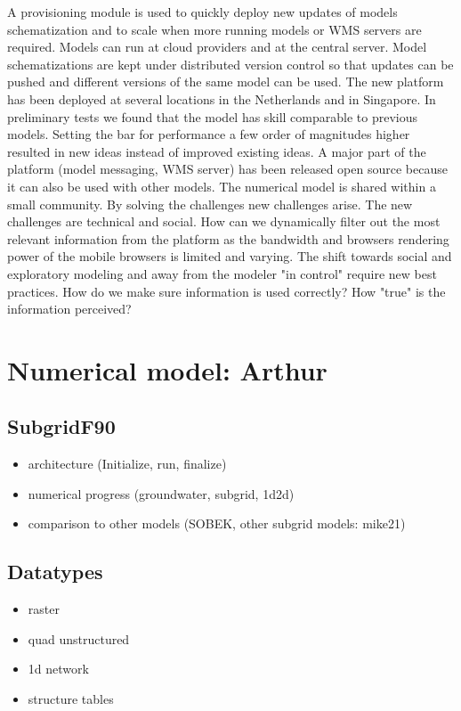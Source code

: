 \documentclass[a4paper]{article}
\begin{document}
A provisioning module is used to quickly deploy new updates of models schematization and to scale when more running models or WMS servers are required. Models can run at cloud providers and at the central server. Model schematizations are kept under distributed version control so that updates can be pushed and different versions of the same model can be used.
The new platform has been deployed at several locations in the Netherlands and in Singapore. In preliminary tests we found that the model has skill comparable to previous models. Setting the bar for performance a few order of magnitudes higher resulted in new ideas instead of improved existing ideas. A major part of the platform (model messaging, WMS server) has been released open source because it can also be used with other models. The numerical model is shared within a small community.
By solving the challenges new challenges arise. The new challenges are technical and social. How can we dynamically filter out the most relevant information from the platform as the bandwidth and browsers rendering power of the mobile browsers is limited and varying. The shift towards social and exploratory modeling and away from the modeler "in control" require new best practices. How do we make sure information is used correctly? How "true" is the information perceived?

\section{Numerical model: Arthur}
\subsection{SubgridF90}
\begin{itemize}
  \item architecture (Initialize, run, finalize)
  \item numerical progress (groundwater, subgrid, 1d2d)
  \item comparison to other models (SOBEK, other subgrid models: mike21)
\end{itemize}


\subsection{Datatypes}
\begin{itemize}
  \item raster
  \item quad unstructured
  \item 1d network
  \item structure tables
\end{itemize}
\end{document}
